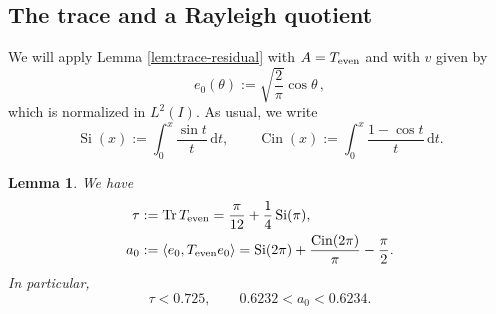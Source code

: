 \documentclass[11pt]{article}
\newtheorem{lemma}[theorem]{Lemma}
\theoremstyle{definition}
\theoremstyle{remark}
\newcommand{\ip}[2]{\left\langle #1,#2\right\rangle}
\newcommand{\dd}{\,\mathrm{d}}
\newcommand{\Tr}{\operatorname{Tr}}
\begin{document}

\subsection*{The trace and a Rayleigh quotient}

We will apply Lemma \ref{lem:trace-residual} with $A=T_{\rm even}$ and with $v$ given by
\begin{equation}\label{eq:e0-def}
e_0(\theta):=\sqrt{\frac2\pi}\cos\theta \,,
\end{equation}
which is normalized in $L^2(I)$. As usual, we write
\[
\operatorname{Si}(x):=\int_0^x\frac{\sin t}{t}\dd t,
\qquad
\operatorname{Cin}(x):=\int_0^x\frac{1-\cos t}{t}\dd t.
\]



\begin{lemma}\label{lem:trace-and-rayleigh}
We have
\begin{align}
\tau&:= \Tr T_{\rm even} = \frac{\pi}{12}+\frac14\operatorname{Si}(\pi),
\label{eq:tau-exact}\\
a_0& :=\ip{e_0}{T_{\rm even}e_0}
=\operatorname{Si}(2\pi)
+\frac{\operatorname{Cin}(2\pi)}{\pi}-\frac\pi2.
\label{eq:a0-exact}
\end{align}
In particular,
\begin{equation}\label{eq:tau-a0-numerical}
\tau<0.725,
\qquad
0.6232<a_0<0.6234.
\end{equation}
\end{lemma}
\end{document}
